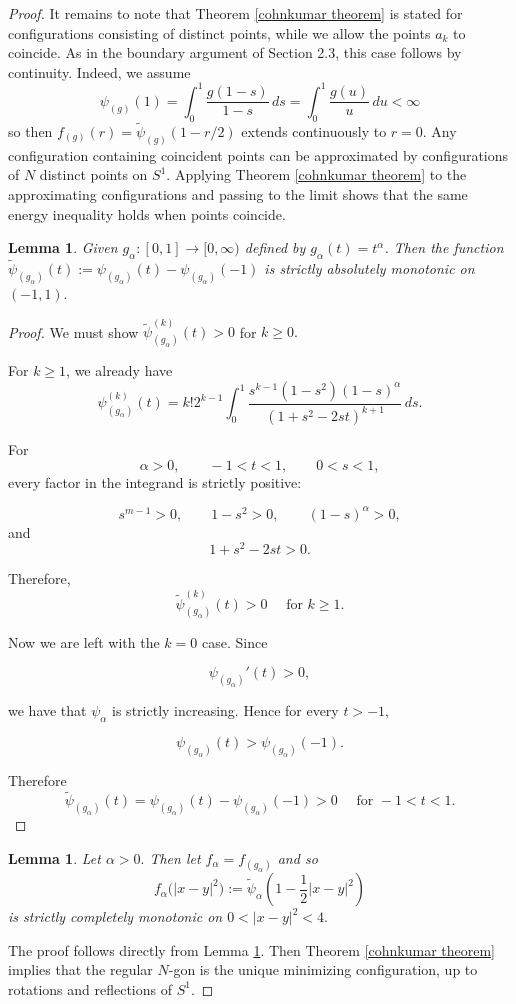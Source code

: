 \documentclass{article}
\newtheorem{lemma}[theorem]{Lemma}
\begin{document}
\begin{proof}
It remains to note that Theorem \ref{cohnkumar theorem} is stated for configurations consisting of distinct points, while we allow the points \(a_k\) to coincide. As in the boundary argument of Section 2.3, this case follows by continuity. Indeed, we assume
$$
\psi_{(g)}(1)=\int_0^1 \frac{g(1-s)}{1-s}\,ds= \int_0^1 \frac{g(u)}{u}\,du<\infty
$$
so then \(f_{(g)}(r)=\widetilde{\psi}_{(g)}(1-r/2)\) extends continuously to $r=0$. Any configuration containing coincident points can be approximated by configurations of $N$ distinct points on $S^1$. Applying Theorem \ref{cohnkumar theorem} to the approximating configurations and passing to the limit shows that the same energy inequality holds when points coincide.


\begin{lemma}\label{alpha is strictly abs mon}
     Given  $g_\alpha:[0,1]\rightarrow [0,\infty)$ defined by $g_\alpha(t)=t^\alpha$.  Then the function $\widetilde{\psi}_{(g_\alpha)}(t):= \psi_{(g_\alpha)}(t)-\psi_{(g_\alpha)}(-1) $ is strictly absolutely monotonic on $(-1,1).$
\end{lemma}

 \begin{proof}
We must show $\widetilde{\psi}_{(g_\alpha)}^{(k)}(t)> 0$ for $k\geq0.$ 

For $k\geq 1$, we already have
$$ \psi_{(g_\alpha)}^{(k)}(t) = k!2^{k-1} \int_0^1 \frac{s^{k-1}(1-s^2)(1-s)^\alpha} {(1+s^2-2st)^{k+1}} \,ds. $$

For
$$ \alpha>0,\qquad -1<t<1,\qquad 0<s<1, $$
every factor in the integrand is strictly positive:

$$ s^{m-1}>0,\qquad 1-s^2>0,\qquad (1-s)^\alpha>0, $$
and
$$ 1+s^2-2st>0. $$

Therefore,
\[\widetilde{\psi}_{(g_\alpha)}^{(k)}(t)> 0 \quad \text{ for } k\geq 1.\]

Now we are left with the $k=0$ case. Since

$$ \psi_{(g_\alpha)}'(t)>0, $$

we have that $\psi_\alpha$ is strictly increasing. Hence for every $t>-1$,

$$ \psi_{(g_\alpha)}(t)>\psi_{(g_\alpha)}(-1). $$

Therefore \[\widetilde{\psi}_{(g_\alpha)}(t)= \psi_{(g_\alpha)}(t)-\psi_{(g_\alpha)}(-1)>0 \quad \text{ for } -1<t<1.\]

 \end{proof}
 
\begin{lemma}
Let $\alpha>0.$ Then let $f_\alpha=f_{(g_\alpha)}$ and so \[f_\alpha\bigl(|x-y|^2\bigr)
:=\widetilde{\psi}_\alpha\left(1-\frac12|x-y|^2\right)\]
is strictly completely monotonic on $0<|x-y|^2<4.$
\end{lemma}
The proof follows directly from Lemma \ref{alpha is strictly abs mon}. 
Then Theorem \ref{cohnkumar theorem} implies that the regular $N$-gon is the unique minimizing configuration, up to rotations and reflections of $S^1$.
\end{proof}
\end{document}
